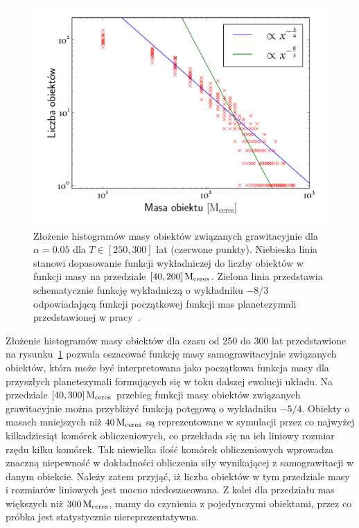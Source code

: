 \begin{figure}[ht]
   \centering
   \includegraphics[width=0.7\linewidth]{figures/mass_func}
   \caption{Złożenie histogramów masy obiektów związanych grawitacyjnie dla
   $\alpha = 0.05$ dla $T \in [250, 300]$ lat (czerwone punkty). Niebieska linia
stanowi dopasowanie funkcji wykładniczej do liczby obiektów w funkcji masy na
przedziale $[40,200]\hbox{$\mathrm{\thinspace M_{\textrm{ceres}}}$}$. Zielona linia przedstawia schematycznie funkcję
wykładniczą o wykładniku $-8/3$ odpowiadającą funkcji początkowej funkcji mas
planetezymali przedstawionej w pracy~\cite{MFFK98}.}
   \label{fig:massfun}
\end{figure}
%
\par Złożenie histogramów masy obiektów dla czasu od 250 do 300 lat
przedstawione na rysunku~\ref{fig:massfun} pozwala oszacować funkcję masy
samograwitacyjnie związanych obiektów, która może być interpretowana jako
początkowa funkcja masy dla przyszłych planetezymali formujących się w toku
dalszej ewolucji układu. Na przedziale $[40, 300]\hbox{$\mathrm{\thinspace M_{\textrm{ceres}}}$}$ przebieg funkcji masy
obiektów związanych grawitacyjnie można przybliżyć funkcją potęgową o wykładniku
$-5/4$. Obiekty o masach mniejszych niż $40\hbox{$\mathrm{\thinspace M_{\textrm{ceres}}}$}$ są reprezentowane w
symulacji przez co najwyżej kilkadziesiąt komórek obliczeniowych, co przekłada
się na ich liniowy rozmiar rzędu kilku komórek. Tak niewielka ilość komórek
obliczeniowych wprowadza znaczną niepewność w dokładności obliczenia
siły wynikającej z samograwitacji w danym obiekcie. Należy zatem przyjąć, iż
liczba obiektów w tym przedziale masy i rozmiarów liniowych jest mocno
niedoszacowana. Z kolei dla przedziału mas większych niż $300\hbox{$\mathrm{\thinspace M_{\textrm{ceres}}}$}$, mamy
do czynienia z pojedynczymi obiektami, przez co próbka jest statystycznie
niereprezentatywna.
%
